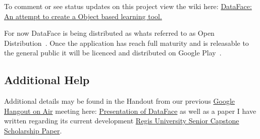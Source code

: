 \documentclass[fontsize=11pt, %
paper=a4, %
twoside, %
captions=tableheading,
index=totoc,
hyperref]{labbook}
\begin{document}
\begin{mdframed}[roundcorner=10pt,leftmargin=1, rightmargin=1,
linecolor=green!40!brown!80,outerlinewidth=.9,
innerleftmargin=8,innertopmargin=8,innerbottommargin=8]
\begin{center}
\begin{minipage}[c]{1.0\textwidth}
To comment or see status updates on this project view the wiki here: \href{https://github.com/trentonknight/DataFaceProject/wiki/DataFace:-An-attempt-to-create-a-Object-based-learning-tool.}{DataFace: An attempt to create a Object based learning tool.}
\end{minipage}
\end{center}
\end{mdframed}
\begin{onehalfspace}
	For now DataFace is being distributed as whats referred to as Open Distribution~\citep{Open}. Once the application has reach full maturity and is releasable to the general public it will be licenced and distributed on Google Play~\citep{play}. 
\subsection{Additional Help}	
	Additional details may be found in the Handout from our previous \href{http://youtu.be/zNNrX_RKESk}{Google Hangout on Air} meeting here: \href{https://docs.google.com/file/d/0B637cz9R6ttwbC1HaFRQODVpZ1k/edit?usp=sharing}{Presentation of DataFace} as well as a paper I have written regarding its current development \href{https://docs.google.com/file/d/0B637cz9R6ttwT2RVdDNVMjBWZ00/edit?usp=sharing}{Regis University Senior Capstone Scholarship Paper}.
\end{onehalfspace}

\clearpage
\printbibliography
\end{document}

